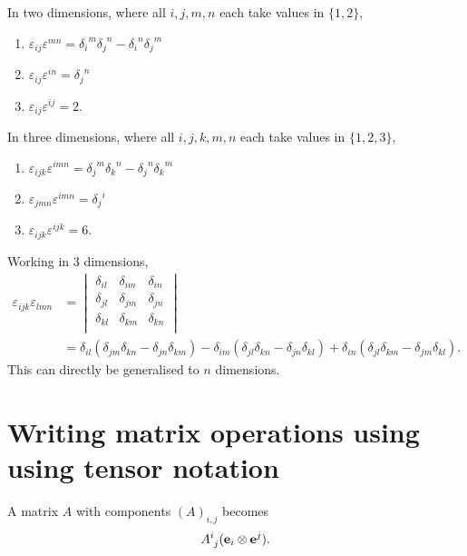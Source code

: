 \begin{corollary}
In two dimensions, where all $i,j,m,n$ each take values in $\{1,2\}$,
\begin{enumerate}
\item $\varepsilon _{ij}\varepsilon ^{mn}={\delta _{i}}^{m}{\delta _{j}}^{n}-{\delta _{i}}^{n}{\delta _{j}}^{m}$
\item $\varepsilon _{ij}\varepsilon ^{in}={\delta _{j}}^{n}$
\item $\varepsilon _{ij}\varepsilon ^{ij}=2.$
\end{enumerate}
\end{corollary}
\begin{corollary}
In three dimensions, where all $i,j,k,m,n$ each take values in $\{1,2,3\}$,
\begin{enumerate}
\item $\varepsilon _{ijk}\varepsilon ^{imn}={\delta _{j}}^{m}{\delta _{k}}^{n}-{\delta _{j}}^{n}{\delta _{k}}^{m}$
\item $\varepsilon _{jmn}\varepsilon ^{imn}={\delta _{j}}^{i}$
\item $\varepsilon _{ijk}\varepsilon ^{ijk}=6.$
\end{enumerate}
\end{corollary}
\begin{proposition}
Working in 3 dimensions,
\begin{align*}
\varepsilon _{ijk}\varepsilon _{lmn}&={\begin{vmatrix}\delta _{il}&\delta _{im}&\delta _{in}\\\delta _{jl}&\delta _{jm}&\delta _{jn}\\\delta _{kl}&\delta _{km}&\delta _{kn}\\\end{vmatrix}}\\[6pt]&=\delta _{il}\left(\delta _{jm}\delta _{kn}-\delta _{jn}\delta _{km}\right)-\delta _{im}\left(\delta _{jl}\delta _{kn}-\delta _{jn}\delta _{kl}\right)+\delta _{in}\left(\delta _{jl}\delta _{km}-\delta _{jm}\delta _{kl}\right).
\end{align*}
This can directly be generalised to $n$ dimensions.
\end{proposition}

\section{Writing matrix operations using using tensor notation}
A matrix $A$ with components $(A)_{i,j}$ becomes
\[ \tensor{A}{^i_j}(\vec{e}_i\otimes \vec{e}^j). \]
